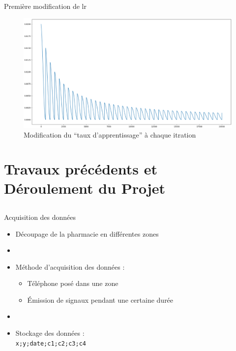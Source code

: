 \documentclass{beamer}
\begin{document}
\begin{frame}[t]{Première modification de lr}
  \begin{figure}
    \begin{center}
      \includegraphics[scale=0.17]{annex/lr_modification}
      \caption{Modification du ``taux d'apprentissage'' à chaque itration}
      \label{ModLR}
    \end{center}
  \end{figure}
\end{frame}

\section[Travaux précédents -- Déroulement]{Travaux précédents et Déroulement du Projet}

\subsection*{}

\begin{frame}{Acquisition des données}
  \begin{itemize}
    \item Découpage de la pharmacie en différentes zones
    \item[]
    \item Méthode d'acquisition des données :
    \begin{itemize}
      \item Téléphone posé dans une zone
      \item \'Emission de signaux pendant une certaine durée
    \end{itemize}
    \item[]
    \item Stockage des données :\\
    \texttt{x;y;date;c1;c2;c3;c4}
  \end{itemize}
\end{frame}
\end{document}

